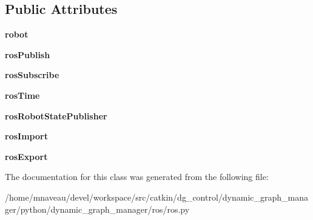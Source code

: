 \subsection*{Public Attributes}
\begin{DoxyCompactItemize}
\item 
{\bfseries robot}\hypertarget{classros_1_1ros_1_1Ros_a0befef81b5386c7b5b1ca0d13d0d2a64}{}\label{classros_1_1ros_1_1Ros_a0befef81b5386c7b5b1ca0d13d0d2a64}

\item 
{\bfseries ros\+Publish}\hypertarget{classros_1_1ros_1_1Ros_a2ddca71f44605c7268029a374070d64b}{}\label{classros_1_1ros_1_1Ros_a2ddca71f44605c7268029a374070d64b}

\item 
{\bfseries ros\+Subscribe}\hypertarget{classros_1_1ros_1_1Ros_a31ff2a70df03c3a0283e4b8a17c019e2}{}\label{classros_1_1ros_1_1Ros_a31ff2a70df03c3a0283e4b8a17c019e2}

\item 
{\bfseries ros\+Time}\hypertarget{classros_1_1ros_1_1Ros_a323ae5f5e4205f31f1bda8424bf534e6}{}\label{classros_1_1ros_1_1Ros_a323ae5f5e4205f31f1bda8424bf534e6}

\item 
{\bfseries ros\+Robot\+State\+Publisher}\hypertarget{classros_1_1ros_1_1Ros_ae35fd5139c151671b1134f4725cbcc33}{}\label{classros_1_1ros_1_1Ros_ae35fd5139c151671b1134f4725cbcc33}

\item 
{\bfseries ros\+Import}\hypertarget{classros_1_1ros_1_1Ros_adaf7ed0ec413adea74e298742c34b36a}{}\label{classros_1_1ros_1_1Ros_adaf7ed0ec413adea74e298742c34b36a}

\item 
{\bfseries ros\+Export}\hypertarget{classros_1_1ros_1_1Ros_a9631d40df4f07890316cead5a94876a3}{}\label{classros_1_1ros_1_1Ros_a9631d40df4f07890316cead5a94876a3}

\end{DoxyCompactItemize}


The documentation for this class was generated from the following file\+:\begin{DoxyCompactItemize}
\item 
/home/mnaveau/devel/workspace/src/catkin/dg\+\_\+control/dynamic\+\_\+graph\+\_\+manager/python/dynamic\+\_\+graph\+\_\+manager/ros/ros.\+py\end{DoxyCompactItemize}

